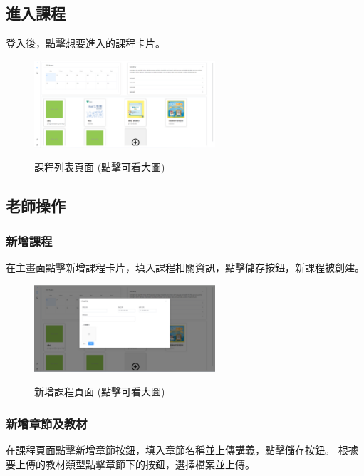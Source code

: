 \documentclass[12pt]{article}
\begin{document}
\subsection{進入課程}
登入後，點擊想要進入的課程卡片。

\begin{figure}[H]
  \centering
  \href{https://raw.githubusercontent.com/programingtw/proglearn-plan/main/2023全國大專校院智慧創新暨跨域整合創作競賽/img/course.png}{
    \includegraphics[width=0.60\textwidth]{./img/course.png}
  }
  \caption{課程列表頁面 (點擊可看大圖)}
\end{figure}

\subsection{老師操作}

\subsubsection{新增課程}
在主畫面點擊新增課程卡片，填入課程相關資訊，點擊儲存按鈕，新課程被創建。

\begin{figure}[H]
  \centering
  \href{https://raw.githubusercontent.com/programingtw/proglearn-plan/main/2023全國大專校院智慧創新暨跨域整合創作競賽/img/addCourse.png}{
    \includegraphics[width=0.60\textwidth]{./img/addCourse.png}
  }
  \caption{新增課程頁面 (點擊可看大圖)}
\end{figure}

\subsubsection{新增章節及教材}
在課程頁面點擊新增章節按鈕，填入章節名稱並上傳講義，點擊儲存按鈕。
根據要上傳的教材類型點擊章節下的按鈕，選擇檔案並上傳。
\end{document}
